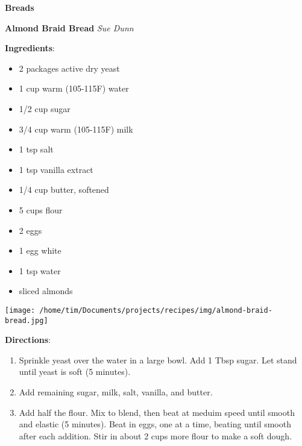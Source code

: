 \documentclass[11pt, twoside, openany]{book}
\begin{document}
{\newpage \LARGE \textbf{Breads}} \label{breads}\vspace{4mm}\\
\noindent\begin{minipage}[t]{\linewidth}%
{\Large\textbf{Almond Braid Bread}} \label{almond-braid-bread}\hfill\textit{Sue Dunn}\\
\noindent\begin{minipage}[t]{0.78\linewidth}%
\textbf{Ingredients}:\vspace{-3mm}
\begin{multicols}{2}
\begin{itemize}\setlength\itemsep{-1mm}
\item 2 packages active dry yeast
\item 1 cup warm (105-115F) water
\item 1/2 cup sugar
\item 3/4 cup warm (105-115F) milk
\item 1 tsp salt
\item 1 tsp vanilla extract
\item 1/4 cup butter, softened
\item 5 cups flour
\item 2 eggs
\item 1 egg white
\item 1 tsp water
\item sliced almonds
\end{itemize}
\end{multicols}
\end{minipage}
\noindent\begin{minipage}[t]{0.18\linewidth}
\centering \strut\vspace*{-\baselineskip}\newline
\texttt{[image: /home/tim/Documents/projects/recipes/img/almond-braid-bread.jpg]}\\
\end{minipage}\vspace{3mm}
\textbf{Directions}:
\vspace{-3mm}\begin{enumerate}\setlength\itemsep{-1mm}
\item Sprinkle yeast over the water in a large bowl. Add 1 Tbsp sugar. Let stand until yeast is soft (5 minutes).
\item Add remaining sugar, milk, salt, vanilla, and butter.
\item Add half the flour. Mix to blend, then beat at meduim speed until smooth and elastic (5 minutes). Beat in eggs, one at a time, beating until smooth after each addition. Stir in about 2 cups more flour to make a soft dough.

\end{enumerate}
\end{minipage}
\end{document}
